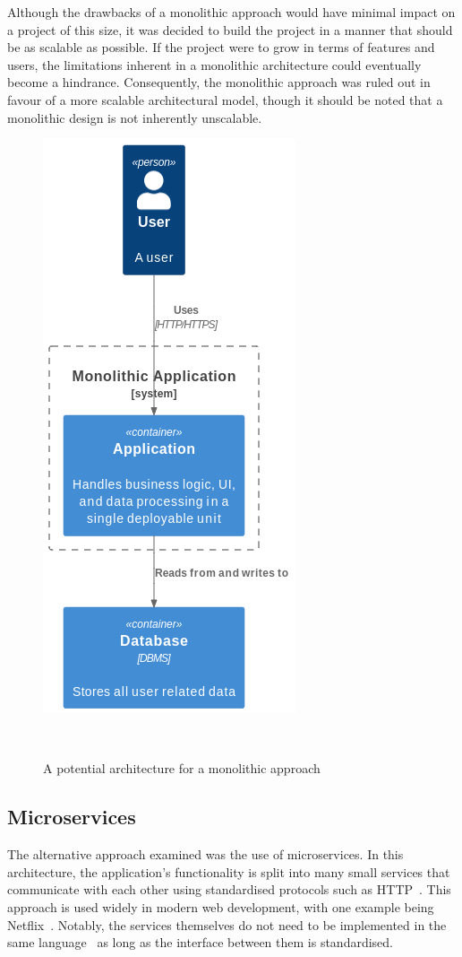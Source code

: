 Although the drawbacks of a monolithic approach would have minimal impact on a project of this size,  it was decided to build the project in a manner that should be as scalable as possible. If the project were to grow in terms of features and users, the limitations inherent in a monolithic architecture could eventually become a hindrance. Consequently, the monolithic approach was ruled out in favour of a more scalable architectural model, though it should be noted that a monolithic design is not inherently unscalable.

\begin{figure} [H]
    \centering
    \includegraphics[width=0.35\linewidth]{figures/monolithic_arch.png}
    \caption{A potential architecture for a monolithic approach}
~\label{fig:monolith-arch}
\end{figure}

\subsection{Microservices}
The alternative approach examined was the use of microservices. In this architecture, the application's functionality is split into many small services that communicate with each other using standardised protocols such as HTTP~\cite{8354423}. This approach is used widely in modern web development, with one example being Netflix~\cite{NetflixMicroservices}. Notably, the services themselves do not need to be implemented in the same language~\cite{7030212} as long as the interface between them is standardised.


